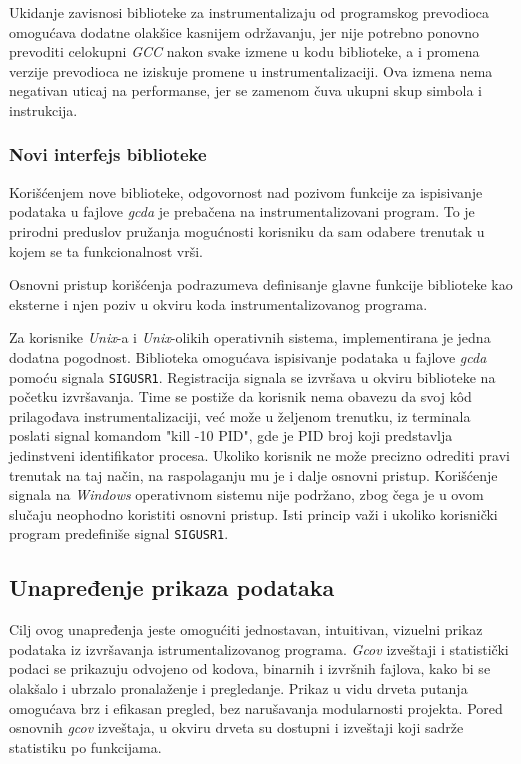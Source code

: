 \documentclass[12pt,oneside]{memoir}
\newcommand{\kod}[1]{\texttt{#1}}
\newcommand{\strano}[1]{\textit{#1}}
\begin{document}
Ukidanje zavisnosi biblioteke za instrumentalizaju od programskog prevodioca omogućava dodatne olakšice kasnijem održavanju, jer nije potrebno ponovno prevoditi celokupni \strano{GCC} nakon svake izmene u kodu biblioteke, a i promena verzije prevodioca ne iziskuje promene u instrumentalizaciji. Ova izmena nema negativan uticaj na performanse, jer se zamenom čuva ukupni skup simbola i instrukcija. 


\subsubsection{Novi interfejs biblioteke}


Korišćenjem nove biblioteke, odgovornost nad pozivom funkcije za ispisivanje podataka u fajlove \strano{gcda} je prebačena na instrumentalizovani program. To je prirodni preduslov pružanja mogućnosti korisniku da sam odabere trenutak u kojem se ta funkcionalnost vrši. 

Osnovni pristup korišćenja podrazumeva definisanje glavne funkcije biblioteke kao eksterne i njen poziv u okviru koda instrumentalizovanog programa. 

Za korisnike \strano{Unix}-a i \strano{Unix}-olikih operativnih sistema, implementirana je jedna dodatna pogodnost. Biblioteka omogućava ispisivanje podataka u fajlove \strano{gcda} pomoću signala \kod{SIGUSR1}. Registracija signala se izvršava u okviru biblioteke na početku izvršavanja. Time se postiže da korisnik nema obavezu da svoj k\^{o}d prilagođava instrumentalizaciji, već može u željenom trenutku, iz terminala poslati signal komandom "kill -10 PID", gde je PID broj koji predstavlja jedinstveni identifikator procesa. Ukoliko korisnik ne može precizno odrediti pravi trenutak na taj način, na raspolaganju mu je i dalje osnovni pristup. Korišćenje signala na \strano{Windows} operativnom sistemu nije podržano, zbog čega je u ovom slučaju neophodno koristiti osnovni pristup. Isti princip važi i ukoliko korisnički program predefiniše signal \kod{SIGUSR1}.


\subsection{Unapređenje prikaza podataka}


Cilj ovog unapređenja jeste omogućiti jednostavan, intuitivan, vizuelni prikaz podataka iz izvršavanja istrumentalizovanog programa. \strano{Gcov} izveštaji i statistički podaci se prikazuju odvojeno od kodova, binarnih i izvršnih fajlova, kako bi se olakšalo i ubrzalo pronalaženje i pregledanje. Prikaz u vidu drveta putanja omogućava brz i efikasan pregled, bez narušavanja modularnosti projekta. Pored osnovnih \strano{gcov} izveštaja, u okviru drveta su dostupni i izveštaji koji sadrže statistiku po funkcijama. 
\end{document}
